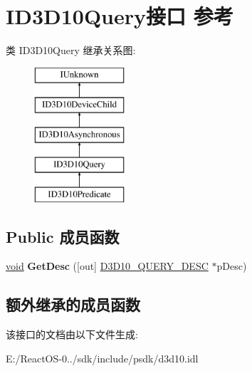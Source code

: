 \hypertarget{interface_i_d3_d10_query}{}\section{I\+D3\+D10\+Query接口 参考}
\label{interface_i_d3_d10_query}
类 I\+D3\+D10\+Query 继承关系图\+:\begin{figure}[H]
\begin{center}
\leavevmode
\includegraphics[height=5.000000cm]{interface_i_d3_d10_query}
\end{center}
\end{figure}
\subsection*{Public 成员函数}
\begin{DoxyCompactItemize}
\item 
\mbox{\label{interface_i_d3_d10_query_aea019961be363e15dc1815b9012add6f}} 
\hyperlink{interfacevoid}{void} {\bfseries Get\+Desc} (\mbox{[}out\mbox{]} \hyperlink{struct_d3_d10___q_u_e_r_y___d_e_s_c}{D3\+D10\+\_\+\+Q\+U\+E\+R\+Y\+\_\+\+D\+E\+SC} $\ast$p\+Desc)
\end{DoxyCompactItemize}
\subsection*{额外继承的成员函数}


该接口的文档由以下文件生成\+:\begin{DoxyCompactItemize}
\item 
E\+:/\+React\+O\+S-\/0../sdk/include/psdk/d3d10.\+idl\end{DoxyCompactItemize}
